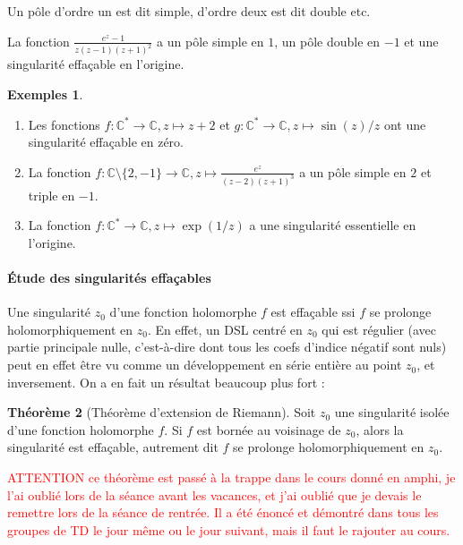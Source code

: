 \documentclass[11pt,a4paper]{article}
\newcommand{\C}{\mathbb{C}}
\theoremstyle{definition}
\newtheorem{theoreme}{Th\'eor\`eme}[section]
\newtheorem{exemples}[theoreme]{Exemples}
\theoremstyle{plain}
\begin{document}
Un pôle d'ordre un est dit simple, d'ordre deux est dit double etc.

\begin{attention}
La fonction $\frac{e^z-1}{z(z-1)(z+1)^2}$ a un pôle simple en $1$, un pôle double en $-1$ et une singularité effaçable en l'origine.
\end{attention}

\begin{exemples}
\begin{enumerate}
\item Les fonctions $f : \C^*\to \C, z\mapsto z+2$ et $g:\C^*\to\C, z\mapsto \sin(z)/z$ ont une singularité effaçable en zéro. 
\item La fonction $f : \C\setminus\{2,-1\}\to \C, z\mapsto \frac{e^z}{(z-2)(z+1)^3}$ a un pôle simple en $2$ et triple en $-1$.
\item La fonction $f : \C^*\to \C, z\mapsto \exp(1/z)$ a une singularité essentielle en l'origine.
\end{enumerate}
\end{exemples}


\paragraph{Étude des singularités effaçables}


Une singularité $z_0$ d'une fonction holomorphe $f$ est effaçable ssi $f$ se prolonge holomorphiquement en $z_0$. En effet, un DSL centré en $z_0$ qui est régulier (avec partie principale nulle, c'est-à-dire dont tous les coefs d'indice négatif sont nuls) peut en effet être vu comme un  développement en série entière au point $z_0$, et inversement. On a en fait un résultat beaucoup plus fort :



\begin{theoreme}[Théorème d'extension de Riemann]
Soit $z_0$ une singularité isolée d'une fonction holomorphe $f$.
Si $f$ est bornée au voisinage de $z_0$, alors la singularité est effaçable, autrement dit $f$ se prolonge holomorphiquement en $z_0$.
\end{theoreme}

\begin{mdframed}[linewidth=3pt]
\textcolor{red}{ATTENTION ce théorème est passé à la trappe dans le cours donné en amphi, je l'ai oublié lors de la séance avant les vacances, et j'ai oublié que je devais le remettre lors de la séance de rentrée.
Il a été énoncé et démontré dans tous les groupes de TD le jour même ou le jour suivant, mais il faut le rajouter au cours.
}
\end{mdframed}
\end{document}
